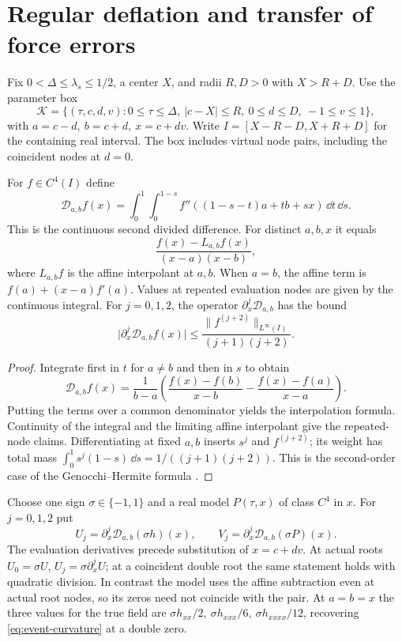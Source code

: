 \section{Regular deflation and transfer of force errors}
\label{sec:deflation}

Fix \(0<\Delta\le\lambda_s\le 1/2\), a center \(X\), and radii \(R,D>0\)
with \(X>R+D\). Use the parameter box
\begin{equation}
\label{eq:box}
\mathcal K=\{(\tau,c,d,v):0\le\tau\le\Delta,\ |c-X|\le R,\
                  0\le d\le D,\ -1\le v\le1\},
\end{equation}
with \(a=c-d,\ b=c+d,\ x=c+dv\). Write
\(I=[X-R-D,X+R+D]\) for the containing real interval. The box includes
virtual node pairs, including the coincident nodes at \(d=0\).

\begin{lemma}
\label{lem:deflation}
For \(f\in C^4(I)\) define
\begin{equation}
\label{eq:simplex}
\mathcal D_{a,b} f(x)=
\int_0^1\!\int_0^{1-s} f''((1-s-t)a+tb+sx)\,\dd t\,\dd s .
\end{equation}
This is the continuous second divided difference. For distinct
\(a,b,x\) it equals
\[
\frac{f(x)-L_{a,b}f(x)}{(x-a)(x-b)},
\]
where \(L_{a,b}f\) is the affine interpolant at \(a,b\). When \(a=b\),
the affine term is \(f(a)+(x-a)f'(a)\). Values at repeated evaluation
nodes are given by the continuous integral. For \(j=0,1,2\), the
operator \(\partial_x^j\mathcal D_{a,b}\) has the bound
\[
\big|\partial_x^j\mathcal D_{a,b} f(x)\big|
\le \frac{\|f^{(j+2)}\|_{L^\infty(I)}}{(j+1)(j+2)} .
\]
\end{lemma}

\begin{proof}
Integrate first in \(t\) for \(a\ne b\) and then in \(s\) to obtain
\[
\mathcal D_{a,b} f(x)=
\frac{1}{b-a}\left(\frac{f(x)-f(b)}{x-b}
                  -\frac{f(x)-f(a)}{x-a}\right).
\]
Putting the terms over a common denominator yields the interpolation
formula. Continuity of the integral and the limiting affine
interpolant give the repeated-node claims. Differentiating at fixed
\(a,b\) inserts \(s^j\) and \(f^{(j+2)}\); its weight has total
mass \(\int_0^1 s^j(1-s)\,\dd s=1/((j+1)(j+2))\).
This is the second-order case of the Genocchi--Hermite formula
\cite[\S9, (52)]{deBoor}.
\end{proof}

Choose one sign \(\sigma\in\{-1,1\}\) and a real model \(P(\tau,x)\) of class \(C^4\) in \(x\).
For \(j=0,1,2\) put
\[
U_j=\partial_x^j\mathcal D_{a,b}(\sigma h)(x),\qquad
V_j=\partial_x^j\mathcal D_{a,b}(\sigma P)(x).
\]
The evaluation derivatives precede substitution of \(x=c+dv\).
At actual roots \(U_0=\sigma U\), \(U_j=\sigma\partial_x^jU\);
at a coincident double root the same statement holds with quadratic
division. In contrast the model uses the affine subtraction even
at actual root nodes, so its zeros need not coincide with the pair.
At \(a=b=x\) the three values for the true field are
\(\sigma h_{xx}/2,\ \sigma h_{xxx}/6,\ \sigma h_{xxxx}/12\),
recovering \eqref{eq:event-curvature} at a double zero.

